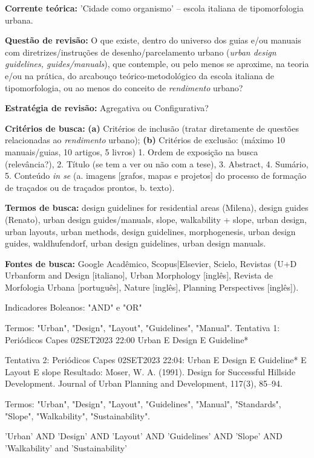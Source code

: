 \documentclass[]{report}
\begin{document}
					\textbf{Corrente teórica:} 'Cidade como organismo' – escola italiana de tipomorfologia urbana.

					\textbf{Questão de revisão:} O que existe, dentro do universo dos guias e/ou manuais com diretrizes/instruções de desenho/parcelamento urbano (\textit{urban design guidelines, guides/manuals}), que contemple, ou pelo menos se aproxime, na teoria e/ou na prática, do arcabouço teórico-metodológico da escola italiana de tipomorfologia, ou ao menos do conceito de \textit{rendimento} urbano?

					\textbf{Estratégia de revisão:} Agregativa ou Configurativa?

					\textbf{Critérios de busca:} \textbf{(a)} Critérios de inclusão (tratar diretamente de questões relacionadas ao \textit{rendimento} urbano); \textbf{(b)} Critérios de exclusão: (máximo 10 manuais/guias, 10 artigos, 5 livros) 1. Ordem de exposição na busca (relevância?), 2. Título (se tem a ver ou não com a tese), 3. Abstract, 4. Sumário, 5. Conteúdo \textit{in se} (a. imagens [grafos, mapas e projetos] do processo de formação de traçados ou de traçados prontos, b. texto).

					\textbf{Termos de busca:} design guidelines for residential areas (Milena), design guides (Renato), urban design guides/manuals, slope, walkability + slope, urban design, urban layouts, urban methods, design guidelines, morphogenesis, urban design guides, waldhufendorf, urban design guidelines, urban design manuals.

					\textbf{Fontes de busca:} Google Acadêmico, Scopus|Elsevier, Scielo, Revistas (U+D Urbanform and Design [italiano], Urban Morphology [inglês], Revista de Morfologia Urbana [português], Nature [inglês], Planning Perspectives [inglês]).

					Indicadores Boleanos: "AND" e "OR"

					Termos: "Urban", "Design", "Layout", "Guidelines", "Manual".
					Tentativa 1: Periódicos Capes 02SET2023 22:00 Urban E Design E Guideline*


					Tentativa 2: Periódicos Capes 02SET2023 22:04: Urban E Design E Guideline* E Layout E slope
					Resultado: Moser, W. A. (1991). Design for Successful Hillside Development. Journal of Urban Planning and Development, 117(3), 85–94.

					Termos: "Urban", "Design", "Layout", "Guidelines", "Manual", "Standards", "Slope", "Walkability", "Sustainability".

					'Urban' AND 'Design' AND 'Layout' AND 'Guidelines' AND 'Slope' AND 'Walkability' and 'Sustainability'
\end{document}
